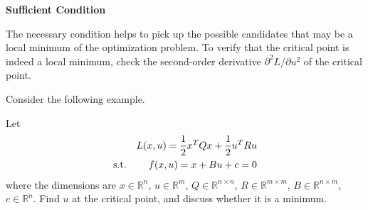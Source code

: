 \vspace{0.1in}
\noindent \textbf{Sufficient Condition}
\vspace{0.1in}

The necessary condition helps to pick up the possible candidates that may be a local minimum of the optimization problem. To verify that the critical point is indeed a local minimum, check the second-order derivative $\partial^2 L / \partial u^2$ of the critical point.

Consider the following example.
\begin{shortbox}

Let
\begin{eqnarray}
	&& L(x, u) = \dfrac{1}{2}x^TQx + \dfrac{1}{2}u^TRu \label{eq:optimalrobustcs:quadraticsurfexp1} \\
	\textup{s.t.} && f(x, u) = x + Bu + c = 0 \nonumber
\end{eqnarray}
where the dimensions are $x\in\mathbb{R}^n$, $u\in\mathbb{R}^m$, $Q\in\mathbb{R}^{n\times n}$, $R\in\mathbb{R}^{m\times m}$, $B\in\mathbb{R}^{n\times m}$, $c\in\mathbb{R}^n$. Find $u$ at the critical point, and discuss whether it is a minimum.

\end{shortbox}

